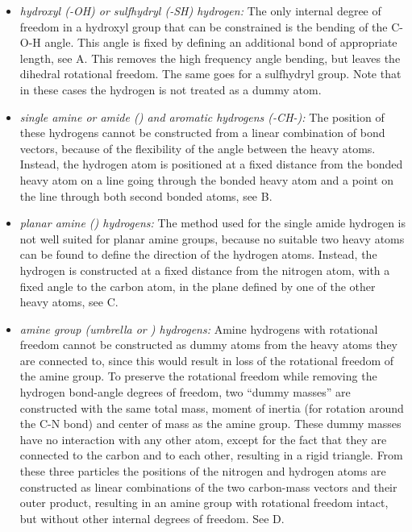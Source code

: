 \begin{itemize}

\item{\em hydroxyl ({\sf -OH}) or sulfhydryl ({\sf -SH})
hydrogen:\/} The only internal degree of freedom in a hydroxyl group
that can be constrained is the bending of the {\sf C-O-H} angle. This
angle is fixed by defining an additional bond of appropriate length,
see A. This removes the high frequency angle bending,
but leaves the dihedral rotational freedom. The same goes for a
sulfhydryl group. Note that in these cases the hydrogen is not treated
as a dummy atom.

\item{\em single amine or amide ({\amines}) and aromatic hydrogens
({\sf -CH-}):\/} The position of these hydrogens cannot be constructed
from a linear combination of bond vectors, because of the flexibility
of the angle between the heavy atoms. Instead, the hydrogen atom is
positioned at a fixed distance from the bonded heavy atom on a line
going through the bonded heavy atom and a point on the line through
both second bonded atoms, see B.

\item{\em planar amine ({\amine}) hydrogens:\/} The method used for
the single amide hydrogen is not well suited for planar amine groups,
because no suitable two heavy atoms can be found to define the
direction of the hydrogen atoms. Instead, the hydrogen is constructed
at a fixed distance from the nitrogen atom, with a fixed angle to the
carbon atom, in the plane defined by one of the other heavy atoms, see
C.

\item{\em amine group (umbrella {\amine} or {\aminep}) hydrogens:\/}
Amine hydrogens with rotational freedom cannot be constructed as dummy
atoms from the heavy atoms they are connected to, since this would
result in loss of the rotational freedom of the amine group. To
preserve the rotational freedom while removing the hydrogen bond-angle
degrees of freedom, two ``dummy masses'' are constructed with the same
total mass, moment of inertia (for rotation around the {\sf C-N} bond)
and center of mass as the amine group. These dummy masses have no
interaction with any other atom, except for the fact that they are
connected to the carbon and to each other, resulting in a rigid
triangle. From these three particles the positions of the nitrogen and
hydrogen atoms are constructed as linear combinations of the two
carbon-mass vectors and their outer product, resulting in an amine
group with rotational freedom intact, but without other internal
degrees of freedom. See D.

\end{itemize}

